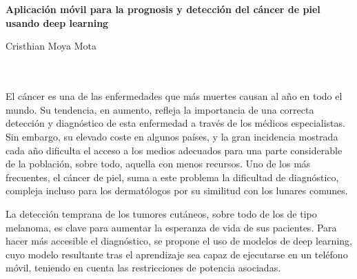 \chapter*{}






\cleardoublepage
\thispagestyle{empty}

\begin{center}
{\large\bfseries Aplicación móvil para la prognosis y detección del cáncer de piel usando deep learning}\\
\end{center}
\begin{center}
Cristhian Moya Mota\\
\end{center}

\\

\vspace{0.7cm}
\\

El cáncer es una de las enfermedades que más muertes causan al año en todo el mundo. Su tendencia, en aumento, refleja la importancia de una correcta detección y diagnóstico de esta enfermedad a través de los médicos especialistas. Sin embargo, su elevado coste en algunos países, y la gran incidencia mostrada cada año dificulta el acceso a los medios adecuados para una parte considerable de la población, sobre todo, aquella con menos recursos. Uno de los más frecuentes, el cáncer de piel, suma a este problema la dificultad de diagnóstico, compleja incluso para los dermatólogos por su similitud con los lunares comunes.

La detección temprana de los tumores cutáneos, sobre todo de los de tipo melanoma, es clave para aumentar la esperanza de vida de sus pacientes. Para hacer más accesible el diagnóstico, se propone el uso de modelos de deep learning, cuyo modelo resultante tras el aprendizaje sea capaz de ejecutarse en un teléfono móvil, teniendo en cuenta las restricciones de potencia asociadas.

